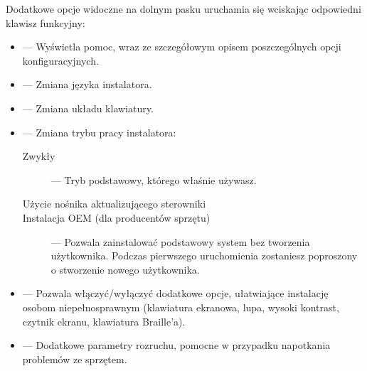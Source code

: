 Dodatkowe opcje widoczne na dolnym pasku uruchamia się wciskając odpowiedni klawisz funkcyjny:
\begin{itemize}
\item {} --- Wyświetla pomoc, wraz ze szczegółowym opisem poszczególnych opcji konfiguracyjnych.
\item {} --- Zmiana języka instalatora.
\item {} --- Zmiana układu klawiatury.
\item {} --- Zmiana trybu pracy instalatora:
        \begin{description}
        \item[\textcolor{ubuntu_orange}{Zwykły}] --- Tryb podstawowy, którego właśnie używasz.
        \item[\textcolor{ubuntu_orange}{Użycie nośnika aktualizującego sterowniki}]
        \item[\textcolor{ubuntu_orange}{Instalacja OEM (dla producentów sprzętu)}] --- Pozwala zainstalować podstawowy system bez tworzenia użytkownika. Podczas pierwszego uruchomienia zostaniesz poproszony o stworzenie nowego użytkownika.
        \end{description}
\item {} --- Pozwala włączyć/wyłączyć dodatkowe opcje, ułatwiające instalację osobom niepełnosprawnym (klawiatura ekranowa, lupa, wysoki kontrast, czytnik ekranu, klawiatura Braille'a).
\item {} --- Dodatkowe parametry rozruchu, pomocne w przypadku napotkania problemów ze sprzętem.
\end{itemize}
\clearpage
